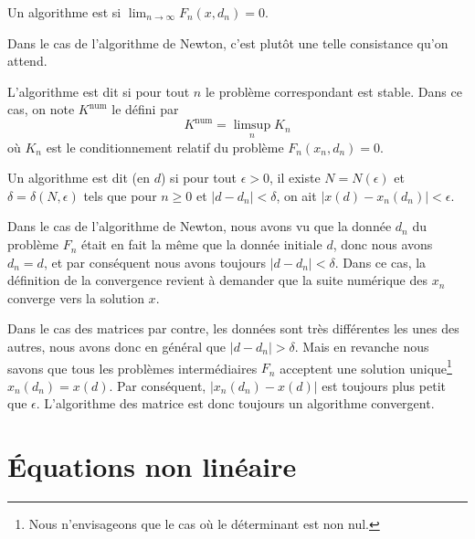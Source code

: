 \begin{definition}
	Un algorithme est  si $\lim_{n\to\infty}F_n(x,d_n)=0$.
\end{definition}
Dans le cas de l'algorithme de Newton, c'est plutôt une telle consistance qu'on attend.

L'algorithme est dit  si pour tout $n$ le problème correspondant est stable.  Dans ce cas, on note $K^{\mbox{num}}$ le   défini par
\begin{equation}
	K^{\mbox{num}}=\limsup_nK_n
\end{equation}
où $K_n$ est le conditionnement relatif du problème $F_n(x_n,d_n)=0$.

\begin{definition}      \label{DefAlgoConverge}
	Un algorithme est dit  (en $d$) si pour tout $\epsilon>0$, il existe $N=N(\epsilon)$ et $\delta=\delta(N,\epsilon)$ tels que pour $n\geq0$ et $|d-d_n|<\delta$, on ait $|x(d)-x_n(d_n)|<\epsilon$.
\end{definition}

\begin{remark}      \label{RemConvAlgoNewton}
Dans le cas de l'algorithme de Newton, nous avons vu que la donnée $d_n$ du problème $F_n$ était en fait la même que la donnée initiale $d$, donc nous avons $d_n=d$, et par conséquent nous avons toujours $| d-d_n |<\delta$. Dans ce cas, la définition de la convergence revient à demander que la suite numérique des $x_n$ converge vers la solution $x$.
\end{remark}

\begin{remark}
Dans le cas des matrices par contre, les données sont très différentes les unes des autres, nous avons donc en général que $| d-d_n |>\delta$. Mais en revanche nous savons que tous les problèmes intermédiaires $F_n$ acceptent une solution unique\footnote{Nous n'envisageons que le cas où le déterminant est non nul.} $x_n(d_n)=x(d)$. Par conséquent, $| x_n(d_n)-x(d) |$ est toujours plus petit que $\epsilon$. L'algorithme des matrice est donc toujours un algorithme convergent.
\end{remark}

\section{Équations non linéaire}

